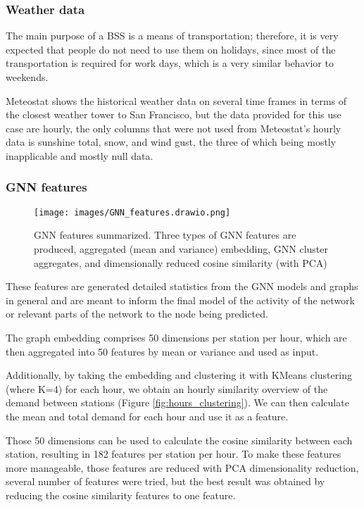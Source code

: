 \documentclass{article}
\begin{document}
\subsubsection{Weather data}
The main purpose of a BSS is a means of transportation; therefore, it is very expected that people do not need to use them on holidays, since most of the transportation is required for work days, which is a very similar behavior to weekends.

Meteostat\cite{meteostat} shows the historical weather data on several time frames in terms of the closest weather tower to San Francisco, but the data provided for this use case are hourly, the only columns that were not used from Meteostat's hourly data is sunshine total, snow, and wind gust, the three of which being mostly inapplicable and mostly null data.

\subsubsection{GNN features}

\begin{figure}
\centering
\texttt{[image: images/GNN\_features.drawio.png]}
\caption{GNN features summarized. Three types of GNN features are produced, aggregated (mean and variance) embedding, GNN cluster aggregates, and dimensionally reduced cosine similarity (with PCA)}
\label{fig:gnn_features_sum}
\end{figure}

These features are generated detailed statistics from the GNN models and graphs in general and are meant to inform the final model of the activity of the network or relevant parts of the network to the node being predicted.

The graph embedding comprises 50 dimensions per station per hour, which are then aggregated into 50 features by mean or variance and used as input.

Additionally, by taking the embedding and clustering it with KMeans clustering (where K=4) for each hour, we obtain an hourly similarity overview of the demand between stations (Figure \ref{fig:hours_clustering}). We can then calculate the mean and total demand for each hour and use it as a feature.

Those 50 dimensions can be used to calculate the cosine similarity between each station, resulting in 182 features per station per hour. To make these features more manageable, those features are reduced with PCA dimensionality reduction, several number of features were tried, but the best result was obtained by reducing the cosine similarity features to one feature.
\end{document}
